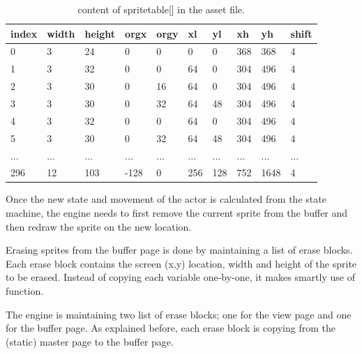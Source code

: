 \documentclass[book.tex]{subfiles}
\begin{document}
\begin{table}[H]
  \begin{tabularx}{\textwidth}[c]{lXXXXXXXXX}
  \hline
  \textbf{index} & \textbf{width} & \textbf{height} & \textbf{orgx} & \textbf{orgy}
    & \textbf{xl} & \textbf{yl} & \textbf{xh} & \textbf{yh} & \textbf{shift} \\ \hline
  0  &   3  &   24  &   0  &   0  &   0  &   0  &   368  &   368  &   4 \\
  1  &   3  &   32  &   0  &   0  &   64  &   0  &   304  &   496  &   4 \\
  2  &   3  &   30  &   0  &   16  &   64  &   0  &   304  &   496  &   4 \\
  3  &   3  &   30  &   0  &   32  &   64  &   48  &   304  &   496  &   4 \\
  4  &   3  &   32  &   0  &   0  &   64  &   0  &   304  &   496  &   4 \\
  5  &   3  &   30  &   0  &   32  &   64  &   48  &   304  &   496  &   4 \\
 ...  &   ...  &   ...  &   ...  &   ...  &   ...  &   ...  &   ...  &   ...  &   ... \\
 296  &   12  &   103  &   -128  &   0  &   256  &   128  &   752  &   1648  &   4\\
  \end{tabularx}
  \caption{content of spritetable[] in the  asset file.}
  \label{table:spritetable}
\end{table}

Once the new state and movement of the actor is calculated from the state machine, the engine needs to first remove the current sprite from the buffer and then redraw the sprite on the new location.\\

\par
Erasing sprites from the buffer page is done by maintaining a list of erase blocks. Each erase block contains the screen (x,y) location, width and height of the sprite to be erased. Instead of copying each variable one-by-one, it makes smartly use of  function. \\

\par
\begin{minipage}{\textwidth}
  
\end{minipage}
\par

The engine is maintaining two list of erase blocks; one for the view page and one for the buffer page. As explained before, each erase block is copying from the (static) master page to the buffer page.\\
\end{document}

